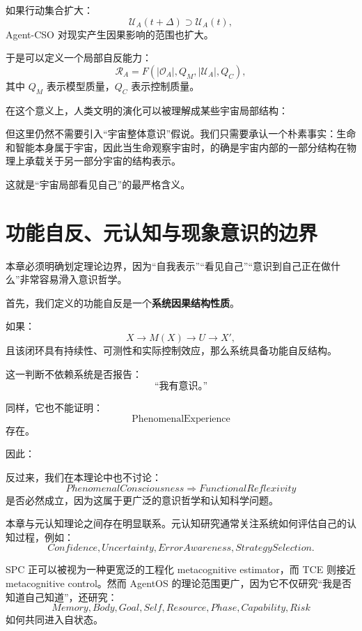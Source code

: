 如果行动集合扩大：
\[
\mathcal U_A(t+\Delta)
\supset
\mathcal U_A(t),
\]
Agent-CSO 对现实产生因果影响的范围也扩大。

于是可以定义一个局部自反能力：
\[
\mathcal R_A
=
F(
|\mathcal O_A|,
Q_M,
|\mathcal U_A|,
Q_C
),
\]
其中 \(Q_M\) 表示模型质量，\(Q_C\) 表示控制质量。

在这个意义上，人类文明的演化可以被理解成某些宇宙局部结构：
\begin{statementbox}
\centering
{}
\end{statementbox}

但这里仍然不需要引入“宇宙整体意识”假说。我们只需要承认一个朴素事实：生命和智能本身属于宇宙，因此当生命观察宇宙时，的确是宇宙内部的一部分结构在物理上承载关于另一部分宇宙的结构表示。

这就是“宇宙局部看见自己”的最严格含义。

\section{功能自反、元认知与现象意识的边界}

本章必须明确划定理论边界，因为“自我表示”“看见自己”“意识到自己正在做什么”非常容易滑入意识哲学。

首先，我们定义的功能自反是一个\textbf{系统因果结构性质}。

如果：
\[
X
\rightarrow
M(X)
\rightarrow
U
\rightarrow
X',
\]
且该闭环具有持续性、可测性和实际控制效应，那么系统具备功能自反结构。

这一判断不依赖系统是否报告：
\[
\text{“我有意识。”}
\]

同样，它也不能证明：
\[
\text{PhenomenalExperience}
\]
存在。

因此：
\begin{statementbox}
\centering
{}
\end{statementbox}

反过来，我们在本理论中也不讨论：
\[
PhenomenalConsciousness
\Rightarrow
FunctionalReflexivity
\]
是否必然成立，因为这属于更广泛的意识哲学和认知科学问题。

本章与元认知理论之间存在明显联系。元认知研究通常关注系统如何评估自己的认知过程，例如：
\[
Confidence,
Uncertainty,
ErrorAwareness,
StrategySelection.
\]

SPC 正可以被视为一种更宽泛的工程化 metacognitive estimator，而 TCE 则接近 metacognitive control。然而 AgentOS 的理论范围更广，因为它不仅研究“我是否知道自己知道”，还研究：
\[
Memory,
Body,
Goal,
Self,
Resource,
Phase,
Capability,
Risk
\]
如何共同进入自状态。

